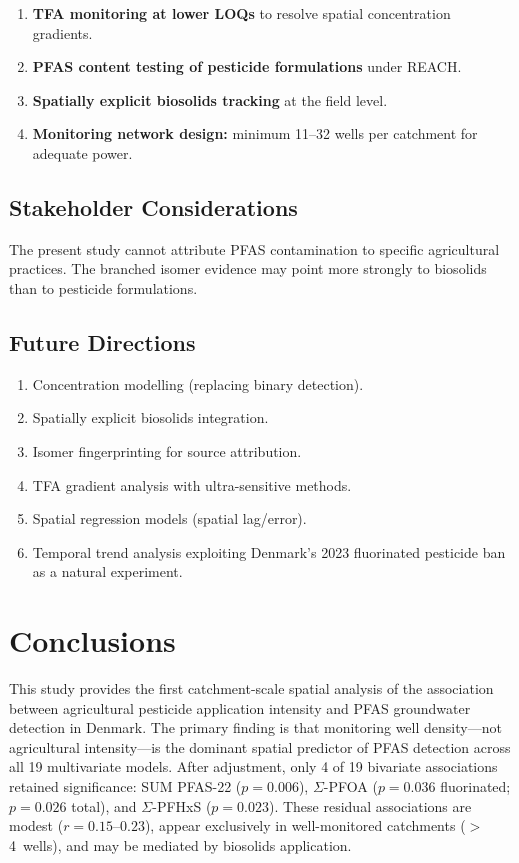 \documentclass[12pt,a4paper]{article}
\begin{document}
\begin{enumerate}
\item \textbf{TFA monitoring at lower LOQs} to resolve spatial concentration gradients.
\item \textbf{PFAS content testing of pesticide formulations} under REACH.
\item \textbf{Spatially explicit biosolids tracking} at the field level.
\item \textbf{Monitoring network design:} minimum 11--32 wells per catchment for adequate power.
\end{enumerate}

\subsection{Stakeholder Considerations}

The present study cannot attribute PFAS contamination to specific agricultural practices. The branched isomer evidence may point more strongly to biosolids than to pesticide formulations.

\subsection{Future Directions}

\begin{enumerate}
\item Concentration modelling (replacing binary detection).
\item Spatially explicit biosolids integration.
\item Isomer fingerprinting for source attribution.
\item TFA gradient analysis with ultra-sensitive methods.
\item Spatial regression models (spatial lag/error).
\item Temporal trend analysis exploiting Denmark's 2023 fluorinated pesticide ban as a natural experiment.
\end{enumerate}

\section{Conclusions}

This study provides the first catchment-scale spatial analysis of the association between agricultural pesticide application intensity and PFAS groundwater detection in Denmark. The primary finding is that monitoring well density---not agricultural intensity---is the dominant spatial predictor of PFAS detection across all 19 multivariate models. After adjustment, only 4 of 19 bivariate associations retained significance: SUM PFAS-22 ($p = 0.006$), $\Sigma$-PFOA ($p = 0.036$ fluorinated; $p = 0.026$ total), and $\Sigma$-PFHxS ($p = 0.023$). These residual associations are modest ($r = 0.15$--$0.23$), appear exclusively in well-monitored catchments ($>$4~wells), and may be mediated by biosolids application.
\end{document}
